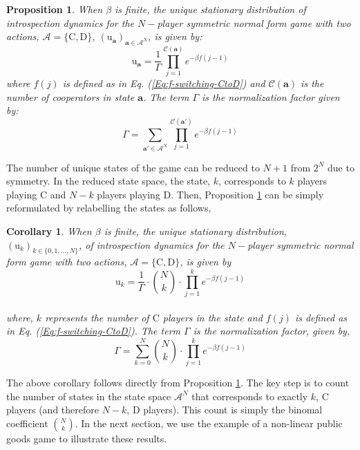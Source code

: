 \documentclass[11pt]{article}
\theoremstyle{plainCl1}
\newtheorem{Prop}{Proposition}
\theoremstyle{plainCl2}
\newtheorem{Corollary}{Corollary}
\newcommand{\abf}{\mathbf{a}}
\newcommand{\C}{\mathrm{C}}
\newcommand{\D}{\mathrm{D}}
\begin{document}
\begin{Prop}
\label{Prop:Symmetric-2-strategies-state}
When $\beta$ is finite, the unique stationary distribution of introspection dynamics for the $N-$player symmetric normal form game with two actions, $\mathcal{A} = \{\C, \D \}$, $(\mathrm{u}_{\abf})_{\abf \in \mathcal{A}^N}$, is given by:
\begin{equation}
\label{Eq:stationary-dist-symm-2-stgs-state}
\mathrm{u}_\abf = \frac{1}{\Gamma} \displaystyle \prod_{j=1}^{\mathcal{C}(\abf)} \displaystyle e^{-\beta f(j-1)}
\end{equation}
where $f(j)$ is defined as in Eq. (\ref{Eq:f-switching-CtoD}) and $\mathcal{C}(\abf)$ is the number of cooperators in state $\abf$. The term $\Gamma$ is the normalization factor given by:
\begin{equation}
\label{Eq:stationary-dist-normalization-symm-2-stgs-state}
\Gamma = \displaystyle \sum_{\abf' \in \mathcal{A}^N} \prod_{j = 1}^{\mathcal{C}(\abf')} \displaystyle e^{-\beta f(j-1)}
\end{equation}
\end{Prop}


\noindent The number of unique states of the game can be reduced to $N+1$ from $2^N$ due to symmetry. In the reduced state space, the state, $k$, corresponds to $k$ players playing $\C$ and $N-k$ players playing $\D$. Then, Proposition \ref{Prop:Symmetric-2-strategies-state} can be simply reformulated by relabelling the states as follows,


\begin{Corollary}
\label{Lemma: Symmetric-2-stg}
When $\beta$ is finite, the unique stationary distribution, $(\mathrm{u}_k)_{k \in \{0,1,...,N\}}$, of introspection dynamics for the $N-$player symmetric normal form game with two actions, $\mathcal{A} = \{\C, \D \}$, is given by \\
\begin{equation}
\label{Eq:stationary-dist-symm-2-stgs}
\mathrm{u}_k = \frac{1}{\Gamma} \cdot {N \choose k} \cdot \displaystyle \prod_{j=1}^{k} \displaystyle e^{-\beta f(j-1)}
\end{equation} \\ 
where, $k$ represents the number of $\C$ players in the state and $f(j)$ is defined as in Eq. (\ref{Eq:f-switching-CtoD}). The term $\Gamma$ is the normalization factor, given by, \\
\begin{equation}
\label{Eq:normalization-Tk}
\Gamma = \displaystyle \sum_{k=0}^N {N \choose k} \cdot \displaystyle \prod_{j=1}^{k} \displaystyle e^{-\beta f(j-1)}
\end{equation}
\end{Corollary}
\noindent The above corollary follows directly from Proposition \ref{Prop:Symmetric-2-strategies-state}. The key step is to count the number of states in the state space $\mathcal{A}^N$ that corresponds to exactly $k$, $\C$ players (and therefore $N-k$, $\D$ players). This count is simply the binomal coefficient $N \choose k$. In the next section, we use the example of a non-linear public goods game to illustrate these results. 
\end{document}

